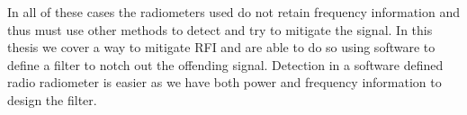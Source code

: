 In all of these cases the radiometers used do not retain frequency information and thus must use other methods to detect and try to mitigate the signal.  In this thesis we cover a way to mitigate RFI and are able to do so using software to define a filter to notch out the offending signal.  Detection in a software defined radio radiometer is easier as we have both power and frequency information to design the filter.








